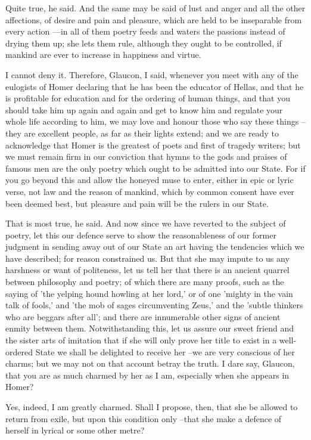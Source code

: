 Quite true, he said.
And the same may be said of lust and anger and all the other affections, of desire and pain and pleasure, which are held to be inseparable from every action ---in all of them poetry feeds and waters the passions instead of drying them up; she lets them rule, although they ought to be controlled, if mankind are ever to increase in happiness and virtue.

I cannot deny it.
Therefore, Glaucon, I said, whenever you meet with any of the eulogists of Homer declaring that he has been the educator of Hellas, and that he is profitable for education and for the ordering of human things, and that you should take him up again and again and get to know him and regulate your whole life according to him, we may love and honour those who say these things --they are excellent people, as far as their lights extend; and we are ready to acknowledge that Homer is the greatest of poets and first of tragedy writers; but we must remain firm in our conviction that hymns to the gods and praises of famous men are the only poetry which ought to be admitted into our State. For if you go beyond this and allow the honeyed muse to enter, either in epic or lyric verse, not law and the reason of mankind, which by common consent have ever been deemed best, but pleasure and pain will be the rulers in our State.

That is most true, he said.
And now since we have reverted to the subject of poetry, let this our defence serve to show the reasonableness of our former judgment in sending away out of our State an art having the tendencies which we have described; for reason constrained us. But that she may impute to us any harshness or want of politeness, let us tell her that there is an ancient quarrel between philosophy and poetry; of which there are many proofs, such as the saying of 'the yelping hound howling at her lord,' or of one 'mighty in the vain talk of fools,' and 'the mob of sages circumventing Zeus,' and the 'subtle thinkers who are beggars after all'; and there are innumerable other signs of ancient enmity between them. Notwithstanding this, let us assure our sweet friend and the sister arts of imitation that if she will only prove her title to exist in a well-ordered State we shall be delighted to receive her --we are very conscious of her charms; but we may not on that account betray the truth. I dare say, Glaucon, that you are as much charmed by her as I am, especially when she appears in Homer?

Yes, indeed, I am greatly charmed.
Shall I propose, then, that she be allowed to return from exile, but upon this condition only --that she make a defence of herself in lyrical or some other metre?

